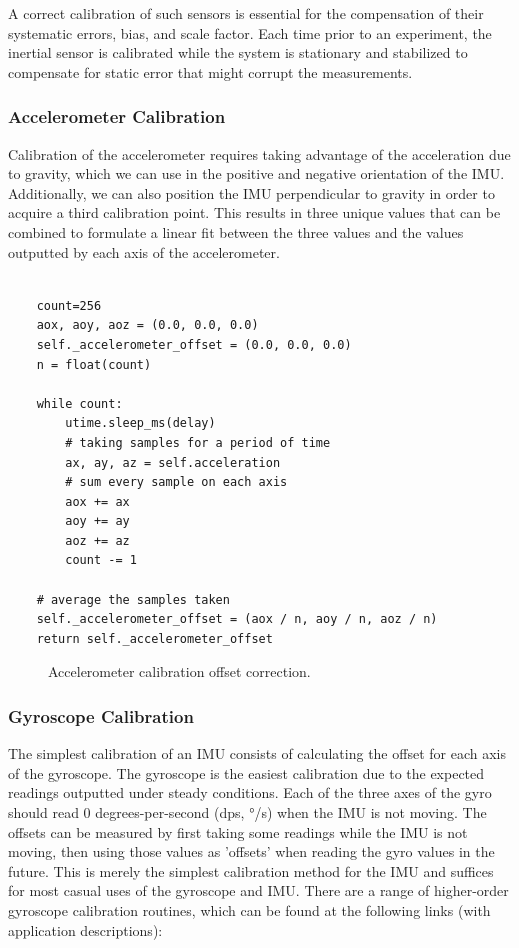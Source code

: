A correct calibration of such sensors is essential for the compensation of their systematic errors, bias, and scale factor. Each time prior to an experiment, the inertial sensor is calibrated while the system is stationary and stabilized to compensate for static error that might corrupt the measurements.

\subsubsection{Accelerometer Calibration}

Calibration of the accelerometer requires taking advantage of the acceleration due to gravity, which we can use in the positive and negative orientation of the IMU. Additionally, we can also position the IMU perpendicular to gravity in order to acquire a third calibration point. This results in three unique values that can be combined to formulate a linear fit between the three values and the values outputted by each axis of the accelerometer.

\lstset{language=Python}
\begin{lstlisting}[frame=single]  % Start your code-block

    count=256
    aox, aoy, aoz = (0.0, 0.0, 0.0)
    self._accelerometer_offset = (0.0, 0.0, 0.0)
    n = float(count)

    while count:
        utime.sleep_ms(delay)
        # taking samples for a period of time
        ax, ay, az = self.acceleration
        # sum every sample on each axis
        aox += ax
        aoy += ay
        aoz += az 
        count -= 1

    # average the samples taken
    self._accelerometer_offset = (aox / n, aoy / n, aoz / n)
    return self._accelerometer_offset
\end{lstlisting}

\begin{figure}[!h]
  \centering
  \resizebox{1\linewidth}{!}{}
  \caption{Accelerometer calibration offset correction.}
\end{figure}

\subsubsection{Gyroscope Calibration}

The simplest calibration of an IMU consists of calculating the offset for each axis of the gyroscope. The gyroscope is the easiest calibration due to the expected readings outputted under steady conditions. Each of the three axes of the gyro should read 0 degrees-per-second (dps, °/s) when the IMU is not moving. The offsets can be measured by first taking some readings while the IMU is not moving, then using those values as 'offsets' when reading the gyro values in the future. This is merely the simplest calibration method for the IMU and suffices for most casual uses of the gyroscope and IMU. There are a range of  higher-order gyroscope calibration routines, which can be found at the following links (with application descriptions):

